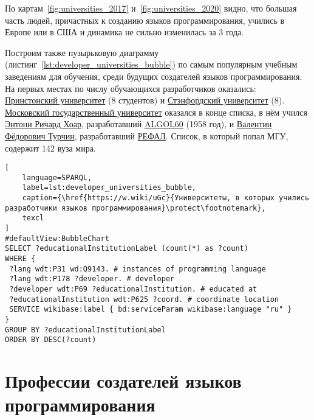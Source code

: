 По картам~\ref{fig:universities_2017} и~\ref{fig:universities_2020} видно, что большая часть людей, причастных к созданию языков программирования, учились в Европе или в США и динамика не сильно изменилась за 3 года.

Построим также пузырьковую диаграмму (листинг~\ref{lst:developer_universities_bubble}) по самым популярным учебным заведениям для обучения, среди будущих создателей языков программирования. На первых местах по числу обучающихся разработчиков оказались: \href{https://www.wikidata.org/wiki/Q21578}{Принстонский университет} (8 студентов) и \href{https://www.wikidata.org/wiki/Q41506}{Стэнфордский университет} (8). \href{https://ru.wikipedia.org/wiki/Московский_государственный_университет}{Московский государственный университет} оказался в конце списка, в нём учился \href{https://www.wikidata.org/wiki/Q92602}{Энтони Ричард Хоар}, разработавший \href{https://www.wikidata.org/wiki/Q188436}{ALGOL60} (1958 год), и \href{https://www.wikidata.org/wiki/Q4466506}{Валентин Фёдорович Турчин}, разработавший \href{https://www.wikidata.org/wiki/Q2626418}{РЕФАЛ}. Список, в который попал МГУ, содержит 142 вуза мира.

\begin{lstlisting}[
	language=SPARQL,
	label=lst:developer_universities_bubble,
	caption={\href{https://w.wiki/uGc}{Университеты, в которых учились разработчики языков программирования}\protect\footnotemark},
	texcl
]
#defaultView:BubbleChart
SELECT ?educationalInstitutionLabel (count(*) as ?count)
WHERE {
 ?lang wdt:P31 wd:Q9143. # instances of programming language
 ?lang wdt:P178 ?developer. # developer
 ?developer wdt:P69 ?educationalInstitution. # educated at
 ?educationalInstitution wdt:P625 ?coord. # coordinate location
 SERVICE wikibase:label { bd:serviceParam wikibase:language "ru" } 	
}
GROUP BY ?educationalInstitutionLabel
ORDER BY DESC(?count)
\end{lstlisting}

\section{Профессии создателей языков программирования}

